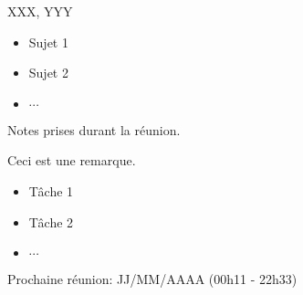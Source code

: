 \documentclass{article}
\begin{document}
    
  \begin{participants}
    XXX, YYY 
  \end{participants}

  \begin{ordredujour}
    \begin{itemize}
      \item Sujet 1
      \item Sujet 2
      \item $\cdots$
    \end{itemize}    
  \end{ordredujour}

  \begin{notes}
    Notes prises durant la réunion.
    \begin{remark}
      Ceci est une remarque.
    \end{remark}
  \end{notes}

  \begin{todo}
    \begin{itemize}
      \item Tâche 1
      \item Tâche 2
      \item $\cdots$
    \end{itemize}
    Prochaine réunion: JJ/MM/AAAA (00h11 - 22h33)
  \end{todo}
\end{document}
